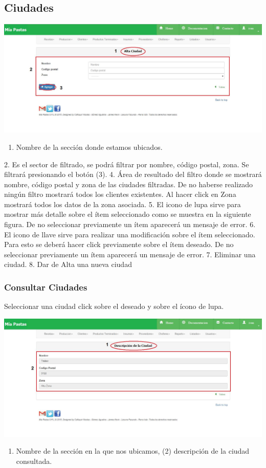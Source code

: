 \documentclass[letterpaper,10pt,english]{sphinxmanual}
\begin{document}
\subsection{{}Ciudades}
\label{ciudades:ciudades}\label{ciudades::doc}
\includegraphics{ciudades_alta.jpg}
\begin{enumerate}
\item {} 
Nombre de la sección donde estamos ubicados.

\end{enumerate}

2.      Es el sector de filtrado, se podrá filtrar por nombre, código postal, zona. Se filtrará presionando el botón (3).
4.      Área de resultado del filtro donde se mostrará nombre, código postal y zona de las ciudades filtradas. De no haberse realizado ningún filtro mostrará todos los clientes existentes. Al hacer click en Zona mostrará todos los datos de la zona asociada.
5.      El icono de lupa sirve para mostrar más detalle sobre el ítem seleccionado como se muestra en la siguiente figura. De no seleccionar previamente un ítem aparecerá un mensaje de error.
6.      El icono de llave sirve para realizar una modificación sobre el ítem seleccionado. Para esto se deberá hacer click previamente sobre el ítem deseado. De no seleccionar previamente un ítem aparecerá un mensaje de error.
7.      Eliminar una ciudad.
8.      Dar de Alta una nueva ciudad


\subsubsection{Consultar Ciudades}
\label{ciudades:consultar-ciudades}
Seleccionar una ciudad click sobre el deseado y sobre el ícono de lupa.

\includegraphics{ciudades_detalle.jpg}
\begin{enumerate}
\item {} 
Nombre de la sección en la que nos ubicamos, (2) descripción de la ciudad consultada.

\end{enumerate}
\end{document}
